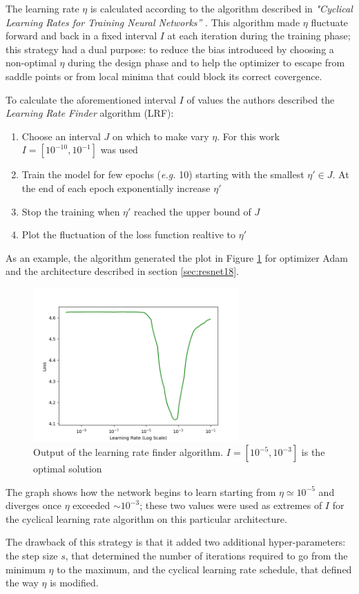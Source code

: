 The learning rate $\eta$ is calculated according to the algorithm described in \emph{"Cyclical Learning Rates for Training Neural
Networks”} \cite{smith2015cyclical}. This algorithm made $\eta$ fluctuate forward and
back in a fixed interval $I$ at each iteration during the training phase;
this strategy had a dual purpose: to reduce the bias introduced by choosing a non-optimal $\eta$ during the design phase and to help the optimizer to escape from saddle points or 
from local minima that could block its correct covergence.\par

To calculate the aforementioned interval $I$ of values the authors described the \textit{Learning Rate Finder} algorithm (LRF):
\begin{enumerate}
\item{Choose an interval $J$ on which to make vary $\eta$. For this work $I = [10^{-10}, 10^{-1}]$ was used} 
\item{Train the model for few epochs (\textit{e.g.} 10) starting with the smallest ${\eta}' \in J$. At the end of each epoch exponentially increase ${\eta}'$}
\item{Stop the training when ${\eta}'$ reached the upper bound of $J$}
\item{Plot the fluctuation of the loss function realtive to ${\eta}'$}
\end{enumerate}
As an example, the algorithm generated the plot in Figure \ref{fig:lr} for optimizer Adam and the architecture described in section \ref{sec:resnet18}. 
\begin{figure}[ht]
\centering
\includegraphics[width=0.7\textwidth]{images/lr_adam.png} 
\caption{Output of the learning rate finder algorithm. $I=[10^{-5}, 10^{-3}]$ is the optimal solution}
\label{fig:lr}
\end{figure}

The graph shows how the network begins to learn starting from $\eta \simeq 10^{-5}$ and diverges once $\eta$ exceeded $\sim10^{-3}$; these two values were used as extremes of $I$ for the cyclical learning rate algorithm on this particular architecture.\par
The drawback of this strategy is that it added two additional hyper-parameters: the step size $s$, that determined the number of iterations required to go from the minimum $\eta$ to the maximum, and the cyclical learning rate schedule, that defined the way $\eta$ is modified. \par

